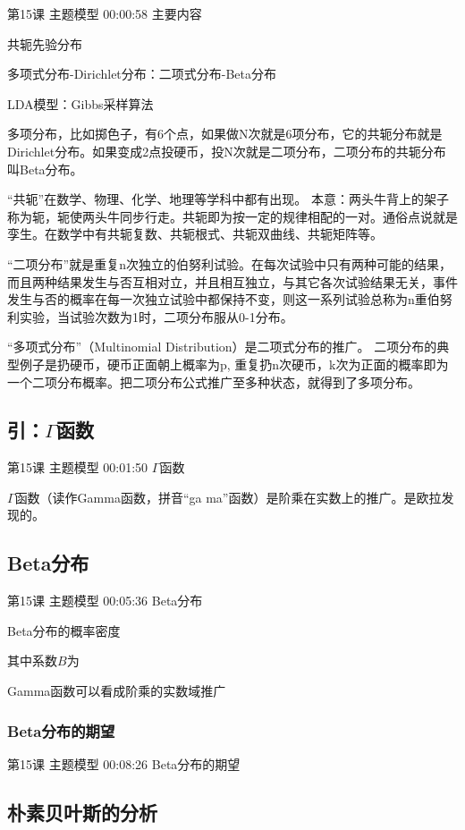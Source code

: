 \documentclass[UTF8]{ctexart}
\begin{document}
第15课 主题模型 00:00:58 主要内容

共轭先验分布

多项式分布-Dirichlet分布：二项式分布-Beta分布

LDA模型：Gibbs采样算法

多项分布，比如掷色子，有6个点，如果做N次就是6项分布，它的共轭分布就是Dirichlet分布。如果变成2点投硬币，投N次就是二项分布，二项分布的共轭分布叫Beta分布。

“共轭”在数学、物理、化学、地理等学科中都有出现。 本意：两头牛背上的架子称为轭，轭使两头牛同步行走。共轭即为按一定的规律相配的一对。通俗点说就是孪生。在数学中有共轭复数、共轭根式、共轭双曲线、共轭矩阵等。

“二项分布”就是重复n次独立的伯努利试验。在每次试验中只有两种可能的结果，而且两种结果发生与否互相对立，并且相互独立，与其它各次试验结果无关，事件发生与否的概率在每一次独立试验中都保持不变，则这一系列试验总称为n重伯努利实验，当试验次数为1时，二项分布服从0-1分布。

“多项式分布”（Multinomial Distribution）是二项式分布的推广。
二项分布的典型例子是扔硬币，硬币正面朝上概率为p, 重复扔n次硬币，k次为正面的概率即为一个二项分布概率。把二项分布公式推广至多种状态，就得到了多项分布。

\subsection{引：$\Gamma$函数}

第15课 主题模型 00:01:50 $\Gamma$函数

$\Gamma$函数（读作Gamma函数，拼音“ga ma”函数）是阶乘在实数上的推广。是欧拉发现的。


\subsection{Beta分布}

第15课 主题模型 00:05:36 Beta分布

Beta分布的概率密度

其中系数$B$为

Gamma函数可以看成阶乘的实数域推广

\subsubsection{Beta分布的期望}

第15课 主题模型 00:08:26 Beta分布的期望

\subsection{朴素贝叶斯的分析}
\end{document}
